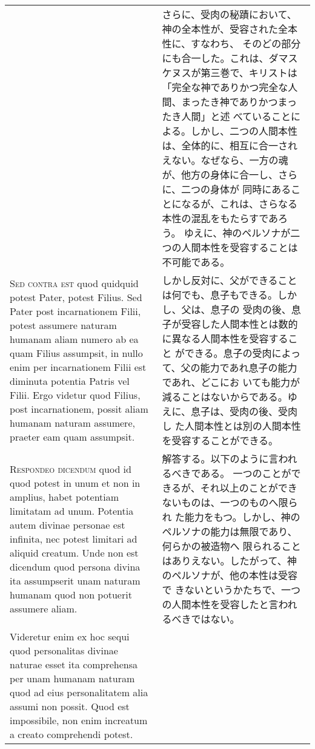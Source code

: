 \documentclass[10pt]{jsarticle} %
\begin{document}
\begin{longtable}{p{21em}p{21em}}
&


さらに、受肉の秘蹟において、神の全本性が、受容された全本性に、すなわち、
 そのどの部分にも合一した。これは、ダマスケヌスが第三巻で、キリストは
 「完全な神でありかつ完全な人間、まったき神でありかつまったき人間」と述
 べていることによる。しかし、二つの人間本性は、全体的に、相互に合一され
 えない。なぜなら、一方の魂が、他方の身体に合一し、さらに、二つの身体が
 同時にあることになるが、これは、さらなる本性の混乱をもたらすであろう。
 ゆえに、神のペルソナが二つの人間本性を受容することは不可能である。

\\



{\scshape Sed contra est} quod quidquid potest Pater, potest Filius. Sed Pater post
incarnationem Filii, potest assumere naturam humanam aliam numero ab ea
quam Filius assumpsit, in nullo enim per incarnationem Filii est
diminuta potentia Patris vel Filii. Ergo videtur quod Filius, post
incarnationem, possit aliam humanam naturam assumere, praeter eam quam
assumpsit.


&

しかし反対に、父ができることは何でも、息子もできる。しかし、父は、息子の
 受肉の後、息子が受容した人間本性とは数的に異なる人間本性を受容すること
 ができる。息子の受肉によって、父の能力であれ息子の能力であれ、どこにお
 いても能力が減ることはないからである。ゆえに、息子は、受肉の後、受肉し
 た人間本性とは別の人間本性を受容することができる。

\\



{\scshape Respondeo dicendum} quod id quod potest in unum et non in amplius, habet
potentiam limitatam ad unum. Potentia autem divinae personae est
infinita, nec potest limitari ad aliquid creatum. Unde non est dicendum
quod persona divina ita assumpserit unam naturam humanam quod non
potuerit assumere aliam. 


&


解答する。以下のように言われるべきである。
一つのことができるが、それ以上のことができないものは、一つのものへ限られ
 た能力をもつ。しかし、神のペルソナの能力は無限であり、何らかの被造物へ
 限られることはありえない。したがって、神のペルソナが、他の本性は受容で
 きないというかたちで、一つの人間本性を受容したと言われるべきではない。

\\


Videretur enim ex hoc sequi quod personalitas
divinae naturae esset ita comprehensa per unam humanam naturam quod ad
eius personalitatem alia assumi non possit. Quod est impossibile, non
enim increatum a creato comprehendi potest. 



\end{longtable}
\end{document}
